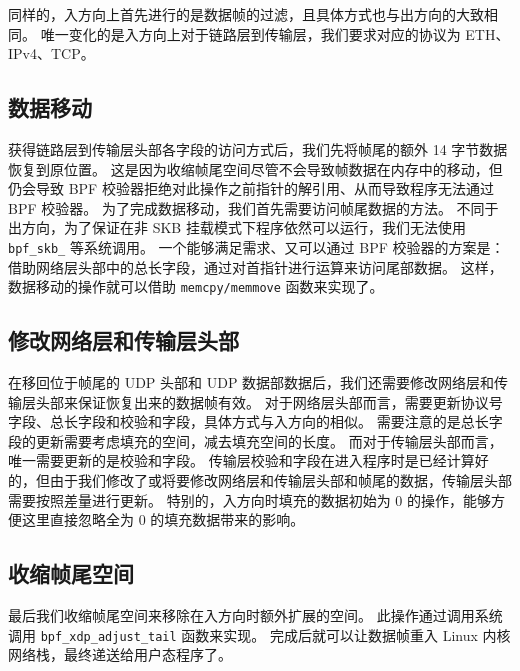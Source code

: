 同样的，入方向上首先进行的是数据帧的过滤，且具体方式也与出方向的大致相同。
唯一变化的是入方向上对于链路层到传输层，我们要求对应的协议为 ETH、IPv4、TCP。

\subsection{数据移动}

获得链路层到传输层头部各字段的访问方式后，我们先将帧尾的额外 14 字节数据恢复到原位置。
这是因为收缩帧尾空间尽管不会导致帧数据在内存中的移动，但仍会导致 BPF 校验器拒绝对此操作之前指针的解引用、从而导致程序无法通过 BPF 校验器。
为了完成数据移动，我们首先需要访问帧尾数据的方法。
不同于出方向，为了保证在非 SKB 挂载模式下程序依然可以运行，我们无法使用 \texttt{bpf\_skb\_\*} 等系统调用。
一个能够满足需求、又可以通过 BPF 校验器的方案是：
借助网络层头部中的总长字段，通过对首指针进行运算来访问尾部数据。
这样，数据移动的操作就可以借助 \texttt{memcpy/memmove} 函数来实现了。

\subsection{修改网络层和传输层头部}

在移回位于帧尾的 UDP 头部和 UDP 数据部数据后，我们还需要修改网络层和传输层头部来保证恢复出来的数据帧有效。
对于网络层头部而言，需要更新协议号字段、总长字段和校验和字段，具体方式与入方向的相似。
需要注意的是总长字段的更新需要考虑填充的空间，减去填充空间的长度。
而对于传输层头部而言，唯一需要更新的是校验和字段。
传输层校验和字段在进入程序时是已经计算好的，但由于我们修改了或将要修改网络层和传输层头部和帧尾的数据，传输层头部需要按照差量进行更新。
特别的，入方向时填充的数据初始为 0 的操作，能够方便这里直接忽略全为 0 的填充数据带来的影响。

\subsection{收缩帧尾空间}

最后我们收缩帧尾空间来移除在入方向时额外扩展的空间。
此操作通过调用系统调用 \texttt{bpf\_xdp\_adjust\_tail} 函数来实现。
完成后就可以让数据帧重入 Linux 内核网络栈，最终递送给用户态程序了。
